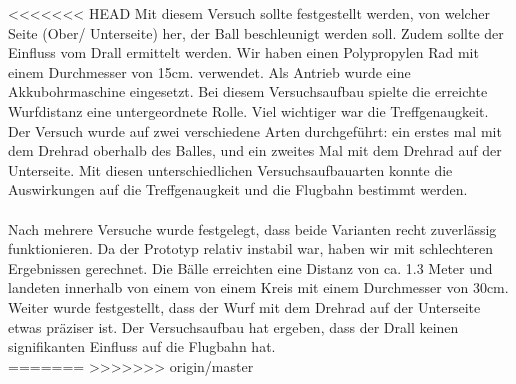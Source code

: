 <<<<<<< HEAD
Mit diesem Versuch sollte festgestellt werden, von welcher Seite (Ober/ Unterseite) her, der Ball beschleunigt werden soll. Zudem sollte der Einfluss vom Drall ermittelt werden. Wir haben einen Polypropylen Rad mit einem Durchmesser von 15cm. verwendet. Als Antrieb wurde eine Akkubohrmaschine eingesetzt. Bei diesem Versuchsaufbau spielte die erreichte Wurfdistanz eine untergeordnete Rolle. Viel wichtiger war die Treffgenaugkeit.  
Der Versuch wurde auf zwei verschiedene Arten durchgeführt: ein erstes mal mit dem Drehrad oberhalb des Balles, und ein zweites Mal mit dem Drehrad auf der Unterseite. Mit diesen unterschiedlichen Versuchsaufbauarten konnte die Auswirkungen auf die Treffgenaugkeit und die Flugbahn bestimmt werden.\\ \\
Nach mehrere Versuche wurde festgelegt, dass beide Varianten recht zuverlässig funktionieren. Da der Prototyp relativ instabil war, haben wir mit schlechteren Ergebnissen gerechnet. Die Bälle erreichten eine Distanz von ca. 1.3 Meter und landeten innerhalb von einem von einem Kreis mit einem Durchmesser von 30cm. 
\\Weiter wurde festgestellt, dass der Wurf mit dem Drehrad auf der Unterseite etwas präziser ist. Der Versuchsaufbau hat ergeben, dass der Drall keinen signifikanten Einfluss auf die Flugbahn hat.\\
=======
>>>>>>> origin/master

